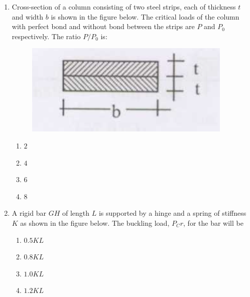 \documentclass[journal]{IEEEtran}
\begin{document}
\begin{enumerate}
\item Cross-section of a column consisting of two steel strips, each of thickness $t$ and width $b$ is shown in the figure below. The critical loads of the column with perfect bond and without bond between the strips are $P$ and $P_0$ respectively. The ratio $P/P_0$ is: \textbf{}
\vspace{0.1cm}

\begin{figure}[h]
    \centering
    \includegraphics[width=0.8\columnwidth]{figs/fig14.png}
\end{figure}

\begin{multicols}{2}
\begin{enumerate}
\item $2$
\item $4$
\item $6$
\item $8$
\end{enumerate}
\end{multicols}

\item A rigid bar $GH$ of length $L$ is supported by a hinge and a spring of stiffness $K$ as shown in the figure below. The buckling load, $P_Cr$, for the bar will be  \textbf{}

\vspace{0.1cm}



\begin{multicols}{2}
\begin{enumerate}
\item $0.5 KL$
\item $0.8 KL$
\item $1.0 KL$
\item $1.2 KL$
\end{enumerate}
\end{multicols}

\vspace{6cm}


\end{enumerate}
\end{document}
